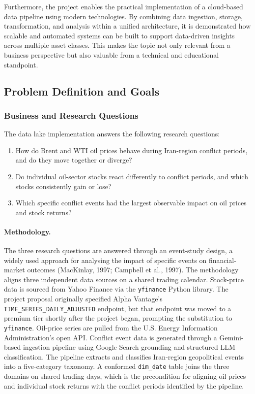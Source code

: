 \documentclass[11pt,a4paper]{article}
\begin{document}
Furthermore, the project enables the practical implementation of a cloud-based data pipeline using modern technologies. By combining data ingestion, storage, transformation, and analysis within a unified architecture, it is demonstrated how scalable and automated systems can be built to support data-driven insights across multiple asset classes. This makes the topic not only relevant from a business perspective but also valuable from a technical and educational standpoint. 

\subsection{Problem Definition and Goals}
\label{sec:problem_goals}

\subsubsection{Business and Research Questions}
\label{sec:research_questions}

The data lake implementation answers the following research questions:

\begin{enumerate}[label=\textbf{Q\arabic*.}, leftmargin=*]
  \item How do Brent and WTI oil prices behave during Iran-region
        conflict periods, and do they move together or diverge?
  \item Do individual oil-sector stocks react differently to conflict
        periods, and which stocks consistently gain or lose?
  \item Which specific conflict events had the largest observable
        impact on oil prices and stock returns?
\end{enumerate}

\paragraph{Methodology.}
The three research questions are answered through an event-study
design, a widely used approach for analysing the impact of specific
events on financial-market outcomes (MacKinlay, 1997; Campbell et al.,
1997). The methodology aligns three independent data sources on a
shared trading calendar. Stock-price data is sourced from Yahoo Finance
via the \texttt{yfinance} Python library. The project proposal
originally specified Alpha Vantage's
\texttt{TIME\_SERIES\_DAILY\_ADJUSTED} endpoint, but that endpoint was
moved to a premium tier shortly after the project began, prompting the
substitution to \texttt{yfinance}. Oil-price series are pulled from the
U.S. Energy Information Administration's open API. Conflict event data
is generated through a Gemini-based ingestion pipeline using Google
Search grounding and structured LLM classification. The pipeline
extracts and classifies Iran-region geopolitical events into a
five-category taxonomy. A conformed \texttt{dim\_date} table joins the
three domains on shared trading days, which is the precondition for
aligning oil prices and individual stock returns with the conflict
periods identified by the pipeline.
\end{document}
